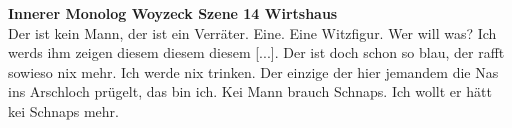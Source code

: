 \documentclass[12pt,a4paper]{report}
\begin{document}
	\thispagestyle{empty}
	\noindent
	\Large \textbf{Innerer Monolog Woyzeck Szene 14 \dq Wirtshaus\dq}
	\normalsize
	\\[0.5cm]
	Der ist kein Mann, der ist ein Verräter.
	Eine.
	Eine Witzfigur.
	Wer will was?
	Ich werds ihm zeigen diesem diesem diesem [...].
	Der ist doch schon so blau, der rafft sowieso nix mehr.
	Ich werde nix trinken.
	Der einzige der hier jemandem die Nas ins Arschloch prügelt, das bin ich.
	Kei Mann brauch Schnaps.
	Ich wollt er hätt kei Schnaps mehr.
\end{document}
